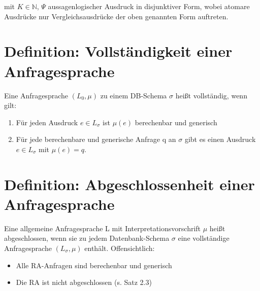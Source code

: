 \documentclass[12pt, a4paper]{article}
\begin{document}
mit $K \in \mathbb{N}$, $\Psi$ aussagenlogischer Ausdruck in disjunktiver Form, wobei atomare Ausdrücke nur Vergleichsausdrücke der oben genannten Form auftreten.


\section*{Definition: Vollständigkeit einer Anfragesprache}

Eine Anfragesprache $(L_0, \mu)$ zu einem DB-Schema $\sigma$ heißt vollständig, wenn gilt: 
\begin{enumerate}
\item Für jeden Ausdruck $e \in L_\sigma$ ist $\mu(e)$ berechenbar und generisch
\item Für jede berechenbare und generische Anfrage q an $\sigma$ gibt es einen Ausdruck $e \in L_\sigma$ mit $\mu(e) = q$.
\end{enumerate}


\section*{Definition: Abgeschlossenheit einer Anfragesprache}

Eine allgemeine Anfragesprache L mit Interpretationsvorschrift $\mu$ heißt abgeschlossen, wenn sie zu jedem Datenbank-Schema $\sigma$ eine vollständige Anfragesprache $(L_\sigma, \mu)$ enthält.
Offensichtlich: 
\begin{itemize}
\item Alle RA-Anfragen sind berechenbar und generisch
\item Die RA ist nicht abgeschlossen (s. Satz 2.3)
\end{itemize}
\end{document}
